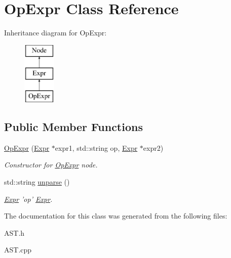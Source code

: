 \hypertarget{classOpExpr}{\section{Op\-Expr Class Reference}
\label{classOpExpr}
}
Inheritance diagram for Op\-Expr\-:\begin{figure}[H]
\begin{center}
\leavevmode
\includegraphics[height=3.000000cm]{classOpExpr}
\end{center}
\end{figure}
\subsection*{Public Member Functions}
\begin{DoxyCompactItemize}
\item 
\hypertarget{classOpExpr_a136fd11044a873d0134134ed09e1c252}{\hyperlink{classOpExpr_a136fd11044a873d0134134ed09e1c252}{Op\-Expr} (\hyperlink{classExpr}{Expr} $\ast$expr1, std\-::string op, \hyperlink{classExpr}{Expr} $\ast$expr2)}\label{classOpExpr_a136fd11044a873d0134134ed09e1c252}

\begin{DoxyCompactList}\small\item\em Constructor for \hyperlink{classOpExpr}{Op\-Expr} node. \end{DoxyCompactList}\item 
\hypertarget{classOpExpr_a0059f9f6b06450c0afd9b41651884383}{std\-::string \hyperlink{classOpExpr_a0059f9f6b06450c0afd9b41651884383}{unparse} ()}\label{classOpExpr_a0059f9f6b06450c0afd9b41651884383}

\begin{DoxyCompactList}\small\item\em \hyperlink{classExpr}{Expr} 'op' \hyperlink{classExpr}{Expr}. \end{DoxyCompactList}\end{DoxyCompactItemize}


The documentation for this class was generated from the following files\-:\begin{DoxyCompactItemize}
\item 
A\-S\-T.\-h\item 
A\-S\-T.\-cpp\end{DoxyCompactItemize}
